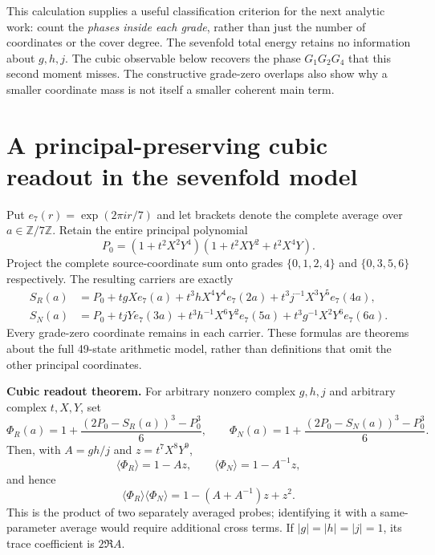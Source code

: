 \documentclass[11pt]{article}
\newcommand{\ZZ}{\mathbb Z}
\begin{document}
This calculation supplies a useful classification criterion for the
next analytic work: count the \emph{phases inside each grade}, rather
than just the number of coordinates or the cover degree.
The sevenfold total energy retains no information about $g,h,j$.
The cubic observable below recovers the phase $G_1G_2G_4$ that this
second moment misses. The constructive grade-zero overlaps also show why
a smaller coordinate mass is not itself a smaller coherent main term.

\section{A principal-preserving cubic readout in the sevenfold model}
\label{sec:G2-seven-cubic}

Put $e_7(r)=\exp(2\pi i r/7)$ and let brackets denote the complete
average over $a\in\ZZ/7\ZZ$. Retain the entire principal polynomial
\[
 P_0=(1+t^2X^2Y^4)(1+t^2XY^2+t^2X^4Y).
\]
Project the complete source-coordinate sum onto grades $\{0,1,2,4\}$
and $\{0,3,5,6\}$ respectively. The resulting carriers are exactly
\[
\begin{split}
 S_R(a)&=P_0+tgX e_7(a)+t^3hX^4Y^4e_7(2a)
                     +t^3j^{-1}X^3Y^5e_7(4a),\\
 S_N(a)&=P_0+tjY e_7(3a)+t^3h^{-1}X^6Y^2e_7(5a)
                     +t^3g^{-1}X^2Y^6e_7(6a).
\end{split}
\]
Every grade-zero coordinate remains in each carrier. These formulas
are theorems about the full 49-state arithmetic model, rather than
definitions that omit the other principal coordinates.

\textbf{Cubic readout theorem.}
For arbitrary nonzero complex $g,h,j$ and arbitrary complex $t,X,Y$, set
\[
 \Phi_R(a)=1+\frac{(2P_0-S_R(a))^3-P_0^3}{6},\qquad
 \Phi_N(a)=1+\frac{(2P_0-S_N(a))^3-P_0^3}{6}.
\]
Then, with $A=gh/j$ and $z=t^7X^8Y^9$,
\[
 \langle\Phi_R\rangle=1-Az,\qquad
 \langle\Phi_N\rangle=1-A^{-1}z,
\]
and hence
\[
 \langle\Phi_R\rangle\langle\Phi_N\rangle
       =1-(A+A^{-1})z+z^2.
\]
This is the product of two separately averaged probes; identifying
it with a same-parameter average would require additional cross terms.
If $|g|=|h|=|j|=1$, its trace coefficient is $2\Re A$.
\end{document}
